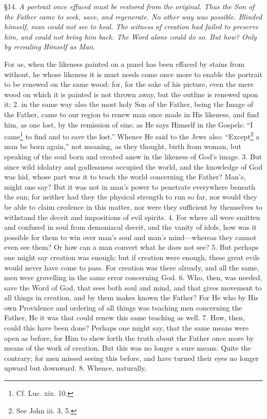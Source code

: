 
§14. \emph{A portrait once effaced must be restored from the original. Thus the Son of the Father came to seek, save, and regenerate. No other way was possible. Blinded himself, man could not see to heal. The witness of creation had failed to preserve him, and could not bring him back. The Word alone could do so. But how? Only by revealing Himself as Man.}

For as, when the likeness painted on a panel has been effaced by stains from without, he whose likeness it is must needs come once more to enable the portrait to be renewed on the same wood: for, for the sake of his picture, even the mere wood on which it is painted is not thrown away, but the outline is renewed upon it; 2. in the same way also the most holy Son of the Father, being the Image of the Father, came to our region to renew man once made in His likeness, and find him, as one lost, by the remission of sins; as He says Himself in the Gospels: “I came\footnote{Cf. Luc. xix. 10.} to find and to save the lost.” Whence He said to the Jews also: “Except\footnote{See John iii. 3, 5.} a man be born again,” not meaning, as they thought, birth from woman, but speaking of the soul born and created anew in the likeness of God’s image. 3. But since wild idolatry and godlessness occupied the world, and the knowledge of God was hid, whose part was it to teach the world concerning the Father? Man’s, might one say? But it was not in man’s power to penetrate everywhere beneath the sun; for neither had they the physical strength to run so far, nor would they be able to claim credence in this matter, nor were they sufficient by themselves to withstand the deceit and impositions of evil spirits. 4. For where all were smitten and confused in soul from demoniacal deceit, and the vanity of idols, how was it possible for them to win over man’s soul and man’s mind—whereas they cannot even see them? Or how can a man convert what he does not see? 5. But perhaps one might say creation was enough; but if creation were enough, these great evils would never have come to pass. For creation was there already, and all the same, men were grovelling in the same error concerning God. 6. Who, then, was needed, save the Word of God, that sees both soul and mind, and that gives movement to all things in creation, and by them makes known the Father? For He who by His own Providence and ordering of all things was teaching men concerning the Father, He it was that could renew this same teaching as well. 7. How, then, could this have been done? Perhaps one might say, that the same means were open as before, for Him to shew forth the truth about the Father once more by means of the work of creation. But this was no longer a sure means. Quite the contrary; for men missed seeing this before, and have turned their eyes no longer upward but downward. 8. Whence, naturally, 
